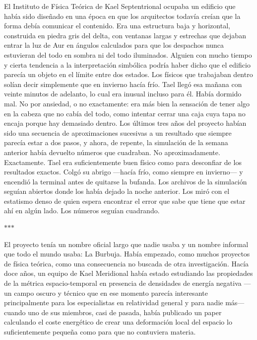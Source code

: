 \documentclass[11pt,a5paper,twoside]{book}
\begin{document}
El Instituto de Física Teórica de Kael Septentrional ocupaba un edificio que había sido diseñado en una época en que los arquitectos todavía creían que la forma debía comunicar el contenido. Era una estructura baja y horizontal, construida en piedra gris del delta, con ventanas largas y estrechas que dejaban entrar la luz de Aur en ángulos calculados para que los despachos nunca estuvieran del todo en sombra ni del todo iluminados. Alguien con mucho tiempo y cierta tendencia a la interpretación simbólica podría haber dicho que el edificio parecía un objeto en el límite entre dos estados. Los físicos que trabajaban dentro solían decir simplemente que en invierno hacía frío.
Tael llegó esa mañana con veinte minutos de adelanto, lo cual era inusual incluso para él.
Había dormido mal. No por ansiedad, o no exactamente: era más bien la sensación de tener algo en la cabeza que no cabía del todo, como intentar cerrar una caja cuya tapa no encaja porque hay demasiado dentro. Los últimos tres años del proyecto habían sido una secuencia de aproximaciones sucesivas a un resultado que siempre parecía estar a dos pasos, y ahora, de repente, la simulación de la semana anterior había devuelto números que cuadraban. No aproximadamente. Exactamente.
Tael era suficientemente buen físico como para desconfiar de los resultados exactos.
Colgó su abrigo —hacía frío, como siempre en invierno— y encendió la terminal antes de quitarse la bufanda. Los archivos de la simulación seguían abiertos donde los había dejado la noche anterior. Los miró con el estatismo denso de quien espera encontrar el error que sabe que tiene que estar ahí en algún lado.
Los números seguían cuadrando.
\vspace{1.5em}
\begin{center}$\ast$\quad$\ast$\quad$\ast$\end{center}
\vspace{1.5em}
El proyecto tenía un nombre oficial largo que nadie usaba y un nombre informal que todo el mundo usaba: La Burbuja. Había empezado, como muchos proyectos de física teórica, como una consecuencia no buscada de otra investigación. Hacía doce años, un equipo de Kael Meridional había estado estudiando las propiedades de la métrica espacio-temporal en presencia de densidades de energía negativa —un campo oscuro y técnico que en ese momento parecía interesante principalmente para los especialistas en relatividad general y para nadie más— cuando uno de sus miembros, casi de pasada, había publicado un paper calculando el coste energético de crear una deformación local del espacio lo suficientemente pequeña como para que no contuviera materia.
\end{document}
